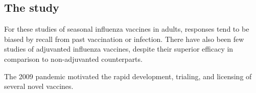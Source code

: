 \subsection{The  study}

%
%
For these studies of seasonal influenza vaccines in adults, responses tend to be biased by recall from past vaccination or infection\autocite{bucasas2011EarlyPatternsGene, nakaya2012SystemsVaccinologyLearning}.
There have also been few studies of adjuvanted influenza vaccines, despite their superior efficacy in comparison to non-adjuvanted counterparts\autocite{wilkins2017AS03MF59AdjuvantedInfluenza,tregoning2018AdjuvantedInfluenzaVaccines}.

The 2009 pandemic motivated the rapid development, trialing, and licensing of several novel vaccines\autocite{broadbent2011InfluenzaVirusVaccines}.

